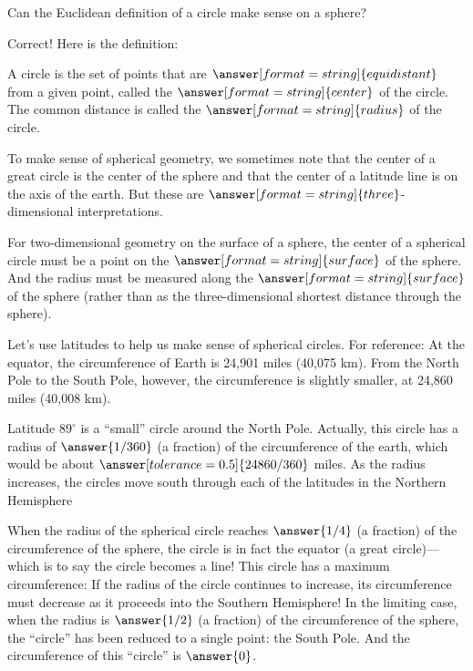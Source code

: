 \documentclass{ximera}
\begin{document}
\begin{problem}
Can the Euclidean definition of a circle make sense on a sphere?  
\begin{multipleChoice}
\end{multipleChoice}
\begin{problem}
Correct! Here is the definition:  

A circle is the set of points that are $\answer[format=string]{equidistant}$ from a given point, called the $\answer[format=string]{center}$ of the circle.  The common distance is called the $\answer[format=string]{radius}$ of the circle.  
\begin{problem}
To make sense of spherical geometry, we sometimes note that the center of a great circle is the center of the sphere and that the center of a latitude line is on the axis of the earth.  But these are $\answer[format=string]{three}$-dimensional interpretations. 

For two-dimensional geometry on the surface of a sphere, the center of a spherical circle must be a point on the $\answer[format=string]{surface}$ of the sphere.  And the radius must be measured along the $\answer[format=string]{surface}$ of the sphere (rather than as the three-dimensional shortest distance through the sphere). 

Let's use latitudes to help us make sense of spherical circles.  For reference:  At the equator, the circumference of Earth is 24,901 miles (40,075 km). From the North Pole to the South Pole, however, the circumference is slightly smaller, at 24,860 miles (40,008 km).  

Latitude $89^\circ$ is a ``small'' circle around the North Pole.  Actually, this circle has a radius of $\answer{1/360}$ (a fraction) of the circumference of the earth, which would be about $\answer[tolerance=0.5]{24860/360}$ miles.  As the radius increases, the circles move south through each of the latitudes in the Northern Hemisphere

When the radius of the spherical circle reaches $\answer{1/4}$ (a fraction) of the circumference of the sphere, the circle is in fact the equator (a great circle)---which is to say the circle becomes a line!   This circle has a maximum circumference:  If the radius of the circle continues to increase, its circumference must decrease as it proceeds into the Southern Hemisphere!  In the limiting case, when the radius is $\answer{1/2}$ (a fraction) of the circumference of the sphere, the ``circle'' has been reduced to a single point:  the South Pole.  And the circumference of this ``circle'' is $\answer{0}$. 
\end{problem}
\end{problem}
\end{problem}
\end{document}
